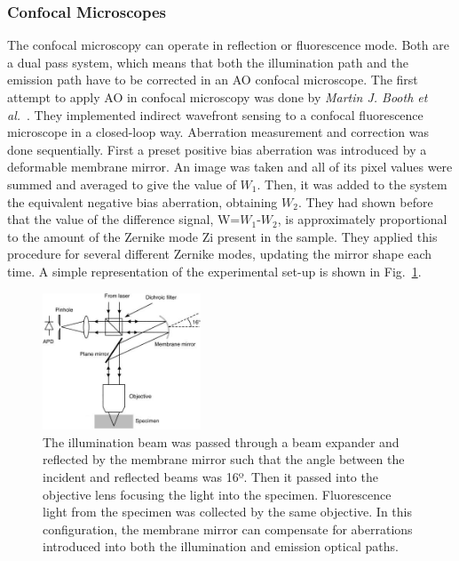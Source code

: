 \subsubsection{Confocal Microscopes}
\label{sec:ConfocalMicroscopes}

The confocal microscopy can operate in reflection or fluorescence mode. Both are a dual pass system, which means that both the illumination path and the emission path have to be corrected in an AO confocal microscope. The first attempt to apply AO in confocal microscopy was done by \textit{Martin J. Booth et al.}~\cite{scan_CFM}. They implemented indirect wavefront sensing to a confocal fluorescence microscope in a closed-loop way. Aberration measurement and correction was done sequentially. First a preset positive bias aberration was introduced by a deformable membrane mirror. An image was taken and all of its pixel values were summed and averaged to give the value of $W_1$. Then, it was added to the system the equivalent negative bias aberration, obtaining $W_2$. They had shown before that the value of the difference signal, W=$W_1$-$W_2$, is approximately proportional to the amount of the Zernike mode Zi present in the sample. They applied this procedure for several different Zernike modes, updating the mirror shape each time. A simple representation of the experimental set-up is shown in Fig.~\ref{fig:AOM_scan_CFM}.

\begin{figure}[htbp]
	\centering
		\includegraphics[width=0.42\textwidth,height=0.22\textheight]{images/AOM_scan_CFM.jpg}
		\caption{The illumination beam was passed through a beam expander and reflected by the membrane mirror such that the angle between the incident and reflected beams was 16º. Then it passed into the objective lens focusing the light into the specimen. Fluorescence light from the specimen was collected by the same objective. In this configuration, the membrane mirror can compensate for aberrations introduced into both the illumination and emission optical paths.}
	\label{fig:AOM_scan_CFM}
\end{figure}
  
